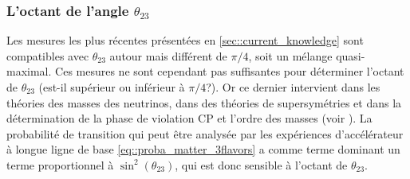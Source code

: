       \subsubsection{L'octant de l'angle \texorpdfstring{$\theta_{23}$}{theta23}}

        Les mesures les plus récentes présentées en \autoref{sec::current_knowledge} sont compatibles avec $\theta_{23}$ autour mais différent de $\pi/4$, soit un mélange quasi-maximal. Ces mesures ne sont cependant pas suffisantes pour déterminer l'octant de $\theta_{23}$ (est-il supérieur ou inférieur à $\pi/4$?). Or ce dernier intervient dans les théories des masses des neutrinos, dans des théories de supersymétries et dans la détermination de la phase de violation CP et l'ordre des masses (voir \cite{Agarwalla2016,King2015a}). La probabilité de transition qui peut être analysée par les expériences d'accélérateur à longue ligne de base \eqref{eq::proba_matter_3flavors} a comme terme dominant un terme proportionnel à $\sin^2(\theta_{23})$, qui est donc sensible à l'octant de $\theta_{23}$.

\FloatBarrier

\begin{subappendices}
    
\end{subappendices}

\FloatBarrier

\printbibliography